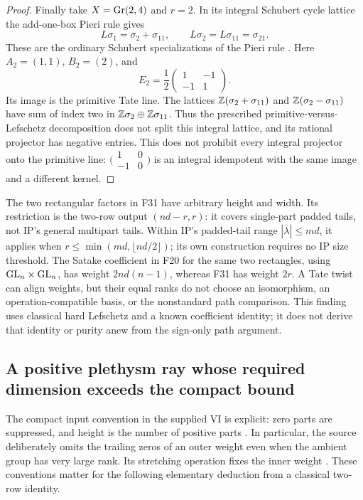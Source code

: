 \documentclass[11pt,a4paper]{article}
\renewcommand{\S}{\ensuremath{\mathsection}}
\newcommand{\fid}[1]{\textsf{#1}}\newcommand{\gate}[1]{\textsf{#1}}
\theoremstyle{named}\newtheorem{finding}{Finding}[section]
\theoremstyle{definition}\newtheorem{definition}[finding]{Definition}
\theoremstyle{remark}\newtheorem{remark}[finding]{Remark}
\begin{document}
\begin{proof}
Finally take $X=\operatorname{Gr}(2,4)$ and $r=2$. In its integral Schubert
cycle lattice the add-one-box Pieri rule gives
\[
 L\sigma_1=\sigma_2+\sigma_{11},\qquad
 L\sigma_2=L\sigma_{11}=\sigma_{21}.
\]
These are the ordinary Schubert specializations of the Pieri rule
\cite[Theorem~7.10, p.~16]{Pieri}. Here $A_2=(1,1)$, $B_2=(2)$,
and
\[
 E_2=\frac12
 \begin{pmatrix}1&-1\\-1&1\end{pmatrix}.
\]
Its image is the primitive Tate line. The lattices
$\mathbb Z(\sigma_2+\sigma_{11})$ and
$\mathbb Z(\sigma_2-\sigma_{11})$ have sum of index two in
$\mathbb Z\sigma_2\oplus\mathbb Z\sigma_{11}$. Thus the prescribed
primitive-versus-Lefschetz decomposition does not split this
integral lattice, and its rational projector has negative entries.
This does not prohibit every integral projector onto the primitive
line: $\bigl(\begin{smallmatrix}1&0\\-1&0\end{smallmatrix}\bigr)$
is an integral idempotent with the same image and a different kernel.
\end{proof}

The two rectangular factors in \fid{F31} have arbitrary height and
width. Its restriction is the two-row output $(nd-r,r)$: it covers
single-part padded tails, not IP's general multipart tails. Within
IP's padded-tail range $|\bar\lambda|\le md$, it applies when
$r\le\min(md,\lfloor nd/2\rfloor)$; its own construction requires
no IP size threshold. The Satake coefficient in \fid{F20} for the
same two rectangles, using $\mathrm{GL}_n\times\mathrm{GL}_n$, has weight
$2nd(n-1)$, whereas \fid{F31} has weight $2r$. A Tate twist can
align weights, but their equal ranks do not choose an isomorphism,
an operation-compatible basis, or the nonstandard path comparison.
This finding uses classical hard Lefschetz and a known coefficient
identity; it does not derive that identity or purity anew from the
sign-only path argument.


\subsection{A positive plethysm ray whose required dimension exceeds the compact bound}
The compact input convention in the supplied VI is explicit: zero parts
are suppressed, and height is the number of positive parts
\cite[\S1.1, p.~9; opening of \S3.4, p.~53]{VI}.
In particular, the source deliberately omits the trailing zeros of an
outer weight even when the ambient group has very large rank.
Its stretching operation fixes the inner weight
\cite[equation~(1.5), p.~20]{VI}.
These conventions matter for the following elementary deduction from a
classical two-row identity.
\end{document}
